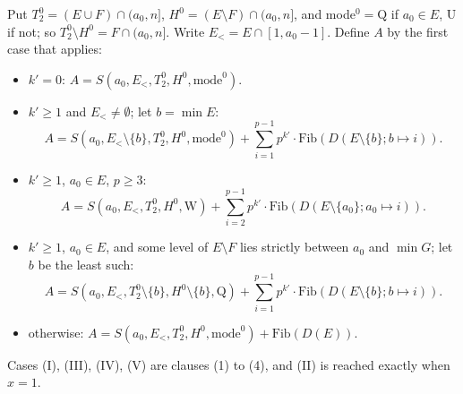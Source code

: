 \documentclass[11pt,a4paper]{amsart}
\theoremstyle{definition}
\theoremstyle{remark}
\begin{document}
Put $T_2^0=(E\cup F)\cap(a_0,n]$, $H^0=(E\setminus F)\cap(a_0,n]$, and mode$^0=\mathrm Q$ if $a_0\in E$,
$\mathrm U$ if not; so $T_2^0\setminus H^0=F\cap(a_0,n]$. Write $E_<=E\cap[1,a_0-1]$. Define $A$ by the first
case that applies:
\begin{itemize}
\item[(I)] $k'=0$: $A=S(a_0,E_<,T_2^0,H^0,\text{mode}^0)$.
\item[(III)] $k'\ge1$ and $E_<\ne\emptyset$; let $b=\min E$:
 \[A=S(a_0,E_<\setminus\{b\},T_2^0,H^0,\text{mode}^0)+\sum_{i=1}^{p-1}p^{k'}\cdot\mathrm{Fib}(D(E\setminus\{b\};b\mapsto i)).\]
\item[(IV)] $k'\ge1$, $a_0\in E$, $p\ge3$:
 \[A=S(a_0,E_<,T_2^0,H^0,\mathrm W)+\sum_{i=2}^{p-1}p^{k'}\cdot\mathrm{Fib}(D(E\setminus\{a_0\};a_0\mapsto i)).\]
\item[(V)] $k'\ge1$, $a_0\in E$, and some level of $E\setminus F$ lies strictly between $a_0$ and $\min G$;
 let $b$ be the least such:
 \[A=S(a_0,E_<,T_2^0\setminus\{b\},H^0\setminus\{b\},\mathrm Q)+\sum_{i=1}^{p-1}p^{k'}\cdot\mathrm{Fib}(D(E\setminus\{b\};b\mapsto i)).\]
\item[(II)] otherwise: $A=S(a_0,E_<,T_2^0,H^0,\text{mode}^0)+\mathrm{Fib}(D(E))$.
\end{itemize}
Cases (I), (III), (IV), (V) are clauses (1) to (4), and (II) is reached exactly when $x=1$.
\end{document}
